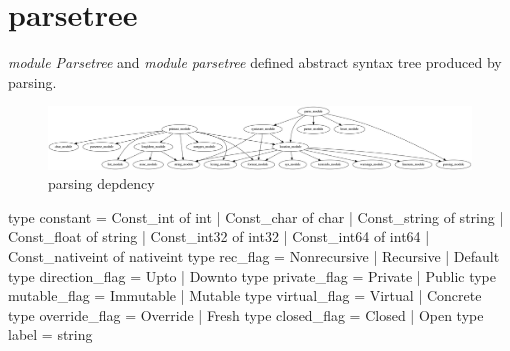 

\section{parsetree}

\textit{module Parsetree} and \textit{module parsetree}
defined abstract syntax tree produced by parsing.

\begin{figure}
  \centering
  \includegraphics[scale=0.2,angle=-90]{graphics/parsing_dep.png}
  \caption{parsing depdency}
  \label{fig:parsing_dep}
\end{figure}


\begin{ocamlcode}
type constant =
    Const_int of int
  | Const_char of char
  | Const_string of string
  | Const_float of string
  | Const_int32 of int32
  | Const_int64 of int64
  | Const_nativeint of nativeint
type rec_flag = Nonrecursive | Recursive | Default
type direction_flag = Upto | Downto
type private_flag = Private | Public
type mutable_flag = Immutable | Mutable
type virtual_flag = Virtual | Concrete
type override_flag = Override | Fresh
type closed_flag = Closed | Open
type label = string
\end{ocamlcode}

\newpage
\inputminted[fontsize=\scriptsize]{ocaml}{code/compiler/ast.ml}

